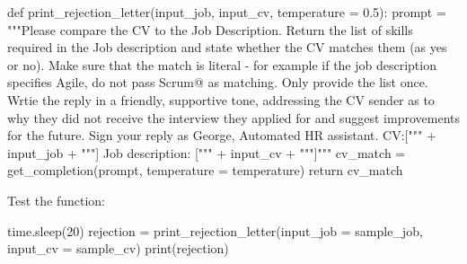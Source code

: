 \documentclass[
  letterpaper,
  DIV=11,
  numbers=noendperiod]{scrartcl}
\newenvironment{Shaded}{\begin{snugshade}}{\end{snugshade}}
\newcommand{\BuiltInTok}[1]{\textcolor[rgb]{0.00,0.23,0.31}{#1}}
\newcommand{\ControlFlowTok}[1]{\textcolor[rgb]{0.00,0.23,0.31}{#1}}
\newcommand{\DecValTok}[1]{\textcolor[rgb]{0.68,0.00,0.00}{#1}}
\newcommand{\FloatTok}[1]{\textcolor[rgb]{0.68,0.00,0.00}{#1}}
\newcommand{\KeywordTok}[1]{\textcolor[rgb]{0.00,0.23,0.31}{#1}}
\newcommand{\NormalTok}[1]{\textcolor[rgb]{0.00,0.23,0.31}{#1}}
\newcommand{\OperatorTok}[1]{\textcolor[rgb]{0.37,0.37,0.37}{#1}}
\newcommand{\StringTok}[1]{\textcolor[rgb]{0.13,0.47,0.30}{#1}}
\begin{document}
\begin{Shaded}
\begin{Highlighting}[]
\KeywordTok{def}\NormalTok{ print\_rejection\_letter(input\_job, input\_cv, temperature }\OperatorTok{=} \FloatTok{0.5}\NormalTok{):}
\NormalTok{    prompt }\OperatorTok{=} \StringTok{"""Please compare the CV to the Job Description. Return the list of skills required in the Job description and state whether the     CV matches them (as yes or no). Make sure that the match is literal {-} for example if the job description specifies \textquotesingle{}Agile\textquotesingle{}, do not pass       \textquotesingle{}Scrum@ as matching. Only provide the list once. Wrtie the reply in a friendly, supportive tone, addressing the CV sender as to why they       did not receive the interview they applied for and suggest improvements for the future. Sign your reply as \textquotesingle{}George, Automated HR              assistant\textquotesingle{}. CV:["""} \OperatorTok{+}\NormalTok{ input\_job }\OperatorTok{+} \StringTok{"""] Job description: ["""} \OperatorTok{+}\NormalTok{ input\_cv }\OperatorTok{+} \StringTok{"""]"""}
\NormalTok{    cv\_match }\OperatorTok{=}\NormalTok{ get\_completion(prompt, temperature  }\OperatorTok{=}\NormalTok{ temperature)}
    \ControlFlowTok{return}\NormalTok{ cv\_match}
\end{Highlighting}
\end{Shaded}

Test the function:

\begin{Shaded}
\begin{Highlighting}[]
\NormalTok{time.sleep(}\DecValTok{20}\NormalTok{)}
\NormalTok{rejection }\OperatorTok{=}\NormalTok{ print\_rejection\_letter(input\_job }\OperatorTok{=}\NormalTok{ sample\_job, input\_cv }\OperatorTok{=}\NormalTok{ sample\_cv)}
\BuiltInTok{print}\NormalTok{(rejection)}
\end{Highlighting}
\end{Shaded}
\end{document}
